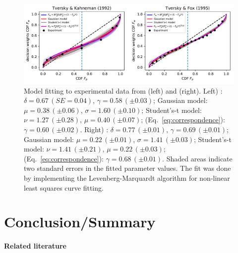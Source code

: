 \documentclass[a4paper, 12pt]{article}
\newcommand{\eref}[1]{(Eq.~\ref{eq:#1})}
\newcommand{\flabel}[1]{\label{fig:#1}}
\newcommand{\MK}[1]{{\it ***MK: #1 MK***}}
\newcommand{\OP}[1]{{\it ***OP: #1 OP***}}
\begin{document}
\begin{figure}[htb]
\centering
\includegraphics[width=1.0\textwidth]{./figs/TK_TF_curvefit_withEq4.pdf}
\caption{Model fitting to experimental data from \cite{TverskyKahneman1992} (left) and \cite{TverskyFox1995} (right).
Left) \cite{LattimoreBakerWitte1992}: $\delta=0.67\,\left(SE = 0.04\right)$, $\gamma=0.58\,\left(\pm0.03\right)$; Gaussian model: $\mu=0.38\,\left(\pm0.06\right)$, $\sigma=1.60\,\left(\pm0.10\right)$; Student's-t model: $\nu=1.27\,\left(\pm0.28\right)$, $\mu=0.40\,\left(\pm0.07\right)$; \cite{TverskyKahneman1992} \eref{correspondence}: $\gamma=0.60\,\left(\pm0.02\right)$. Right) \cite{LattimoreBakerWitte1992}: $\delta=0.77\,\left(\pm0.01\right)$, $\gamma=0.69\,\left(\pm0.01\right)$; Gaussian model: $\mu=0.22\,\left(\pm0.01\right)$, $\sigma=1.41\,\left(\pm0.03\right)$; Student's-t model: $\nu=1.41\,\left(\pm0.21\right)$, $\mu=0.22\,\left(\pm0.03\right)$; \cite{TverskyKahneman1992} \eref{correspondence}: $\gamma=0.68\,\left(\pm0.01\right)$. Shaded areas indicate two standard errors in the fitted parameter values. The fit was done by implementing the Levenberg-Marquardt algorithm \cite{Levenberg1944} for non-linear least squares curve fitting.
}
\flabel{TK_TF_fit}
\end{figure}

\FloatBarrier

\section{Conclusion/Summary}

\paragraph{Related literature}
\end{document}
